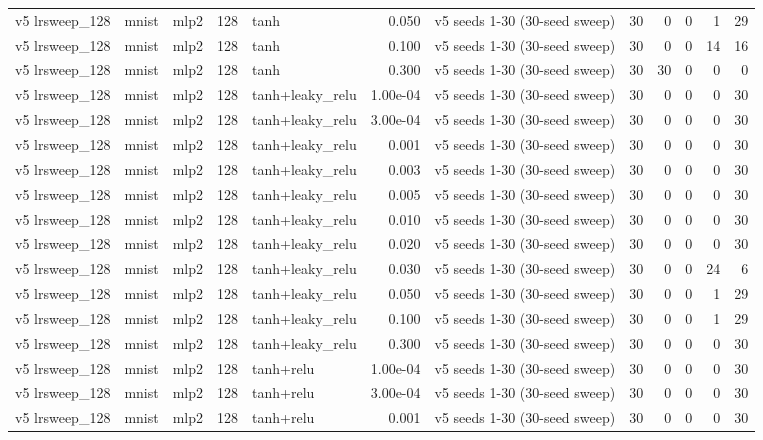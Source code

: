 \begin{table}[htbp]
{\begin{tabular}{@{}lllrlrlrrrrr@{}}
v5 lrsweep\_128 & mnist & mlp2 & 128 & tanh & 0.050 & v5 seeds 1-30 (30-seed sweep) & 30 & 0 & 0 & 1 & 29 \\
v5 lrsweep\_128 & mnist & mlp2 & 128 & tanh & 0.100 & v5 seeds 1-30 (30-seed sweep) & 30 & 0 & 0 & 14 & 16 \\
v5 lrsweep\_128 & mnist & mlp2 & 128 & tanh & 0.300 & v5 seeds 1-30 (30-seed sweep) & 30 & 30 & 0 & 0 & 0 \\
v5 lrsweep\_128 & mnist & mlp2 & 128 & tanh+leaky\_relu & 1.00e-04 & v5 seeds 1-30 (30-seed sweep) & 30 & 0 & 0 & 0 & 30 \\
v5 lrsweep\_128 & mnist & mlp2 & 128 & tanh+leaky\_relu & 3.00e-04 & v5 seeds 1-30 (30-seed sweep) & 30 & 0 & 0 & 0 & 30 \\
v5 lrsweep\_128 & mnist & mlp2 & 128 & tanh+leaky\_relu & 0.001 & v5 seeds 1-30 (30-seed sweep) & 30 & 0 & 0 & 0 & 30 \\
v5 lrsweep\_128 & mnist & mlp2 & 128 & tanh+leaky\_relu & 0.003 & v5 seeds 1-30 (30-seed sweep) & 30 & 0 & 0 & 0 & 30 \\
v5 lrsweep\_128 & mnist & mlp2 & 128 & tanh+leaky\_relu & 0.005 & v5 seeds 1-30 (30-seed sweep) & 30 & 0 & 0 & 0 & 30 \\
v5 lrsweep\_128 & mnist & mlp2 & 128 & tanh+leaky\_relu & 0.010 & v5 seeds 1-30 (30-seed sweep) & 30 & 0 & 0 & 0 & 30 \\
v5 lrsweep\_128 & mnist & mlp2 & 128 & tanh+leaky\_relu & 0.020 & v5 seeds 1-30 (30-seed sweep) & 30 & 0 & 0 & 0 & 30 \\
v5 lrsweep\_128 & mnist & mlp2 & 128 & tanh+leaky\_relu & 0.030 & v5 seeds 1-30 (30-seed sweep) & 30 & 0 & 0 & 24 & 6 \\
v5 lrsweep\_128 & mnist & mlp2 & 128 & tanh+leaky\_relu & 0.050 & v5 seeds 1-30 (30-seed sweep) & 30 & 0 & 0 & 1 & 29 \\
v5 lrsweep\_128 & mnist & mlp2 & 128 & tanh+leaky\_relu & 0.100 & v5 seeds 1-30 (30-seed sweep) & 30 & 0 & 0 & 1 & 29 \\
v5 lrsweep\_128 & mnist & mlp2 & 128 & tanh+leaky\_relu & 0.300 & v5 seeds 1-30 (30-seed sweep) & 30 & 0 & 0 & 0 & 30 \\
v5 lrsweep\_128 & mnist & mlp2 & 128 & tanh+relu & 1.00e-04 & v5 seeds 1-30 (30-seed sweep) & 30 & 0 & 0 & 0 & 30 \\
v5 lrsweep\_128 & mnist & mlp2 & 128 & tanh+relu & 3.00e-04 & v5 seeds 1-30 (30-seed sweep) & 30 & 0 & 0 & 0 & 30 \\
v5 lrsweep\_128 & mnist & mlp2 & 128 & tanh+relu & 0.001 & v5 seeds 1-30 (30-seed sweep) & 30 & 0 & 0 & 0 & 30 \\

\end{tabular}}
\end{table}
